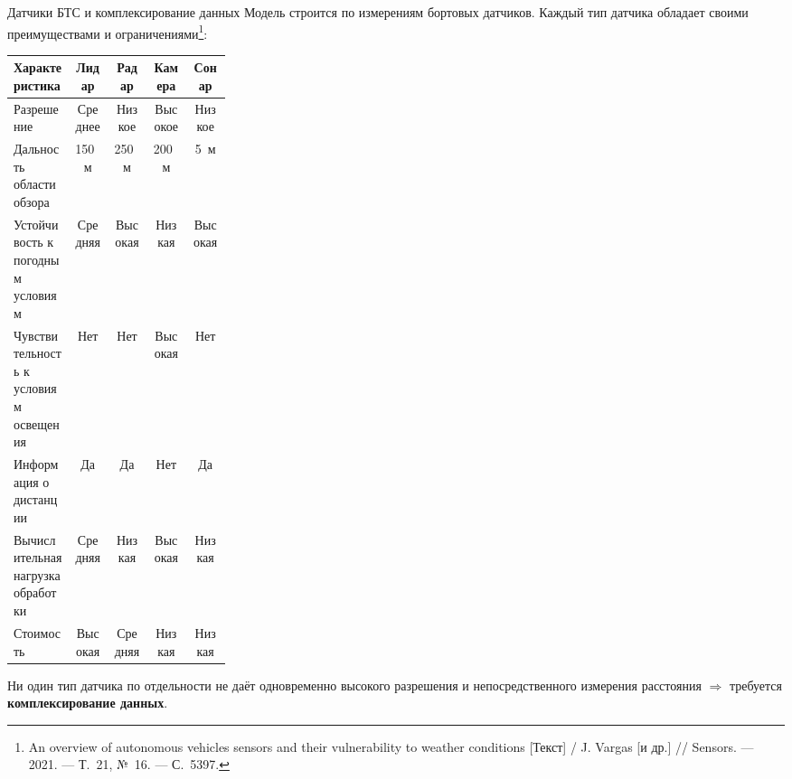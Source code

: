 \begin{frame}{Датчики БТС и комплексирование данных}
	\footnotesize
	Модель строится по измерениям бортовых датчиков. Каждый тип датчика обладает своими преимуществами и ограничениями\footnote{\fontsize{6}{7}\selectfont An overview of autonomous vehicles sensors and their vulnerability to weather conditions [Текст] / J. Vargas [и др.] // Sensors. --- 2021. --- Т.~21, №~16. --- С.~5397.}:

	\begin{table}
		\fontsize{7}{8.4}\selectfont
		\centering
		\begin{tabular}{|p{0.28\linewidth}|c|c|c|c|}
			\hline
			\textbf{Характеристика}          & \textbf{Лидар} & \textbf{Радар} & \textbf{Камера} & \textbf{Сонар}\\
			\hline
			\hline
			Разрешение                       & \cellcolor{yellow!25}Среднее & \cellcolor{red!25}Низкое  & \cellcolor{green!25}Высокое & \cellcolor{red!25}Низкое  \\
			\hline
			Дальность области обзора         & \cellcolor{yellow!25}150~м   & \cellcolor{green!25}250~м   & \cellcolor{yellow!25}200~м   & \cellcolor{red!25}5~м    \\
			\hline
			Устойчивость к погодным условиям & \cellcolor{yellow!25}Средняя & \cellcolor{green!25}Высокая & \cellcolor{red!25}Низкая  & \cellcolor{green!25}Высокая \\
			\hline
			Чувствительность к условиям освещения & \cellcolor{green!25}Нет & \cellcolor{green!25}Нет     & \cellcolor{red!25}Высокая & \cellcolor{green!25}Нет     \\
			\hline
			Информация о дистанции           & \cellcolor{green!25}Да      & \cellcolor{green!25}Да      & \cellcolor{red!25}Нет     & \cellcolor{green!25}Да      \\
			\hline
			Вычислительная нагрузка обработки & \cellcolor{yellow!25}Средняя & \cellcolor{green!25}Низкая & \cellcolor{red!25}Высокая & \cellcolor{green!25}Низкая  \\
			\hline
			Стоимость                        & \cellcolor{red!25}Высокая   & \cellcolor{yellow!25}Средняя & \cellcolor{green!25}Низкая  & \cellcolor{green!25}Низкая  \\
			\hline
		\end{tabular}
	\end{table}

	\vspace{-0.5em}
	Ни один тип датчика по отдельности не даёт одновременно высокого разрешения и непосредственного измерения расстояния $\Rightarrow$ требуется \textbf{комплексирование данных}. %
\end{frame}

